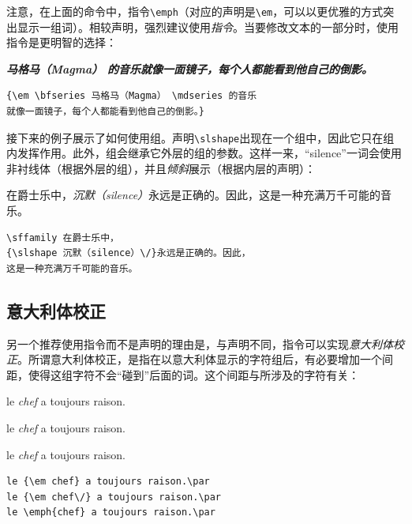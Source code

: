注意，在上面的命令中，指令\verb|\emph|（对应的声明是\verb|\em|，可以以更优雅的方式突出显示一组词）。相较声明，强烈建议使用\emph{指令}。当要修改文本的一部分时，使用指令是更明智的选择：

\begin{codelist}[2.2]{
    {\em \bfseries 马格马（Magma） \mdseries 的音乐就像一面镜子，每个人都能看到他自己的倒影。}
}
    \begin{verbatim}
{\em \bfseries 马格马（Magma） \mdseries 的音乐
就像一面镜子，每个人都能看到他自己的倒影。}
    \end{verbatim}
\end{codelist}

接下来的例子展示了如何使用组。声明\verb|\slshape|出现在一个组中，因此它只在组内发挥作用。此外，组会继承它外层的组的参数。这样一来，“silence”一词会使用\textsf{非衬线}体（根据外层的组），并且\textsl{倾斜}展示（根据内层的声明）：

\begin{codelist}[2.3]{
    \sffamily 在爵士乐中，{\slshape 沉默（silence）\/}永远是正确的。因此，这是一种充满万千可能的音乐。
}\begin{verbatim}\sffamily 在爵士乐中，
{\slshape 沉默（silence）\/}永远是正确的。因此，
这是一种充满万千可能的音乐。
\end{verbatim}
\end{codelist}

\subsection{意大利体校正}

另一个推荐使用指令而不是声明的理由是，与声明不同，指令可以实现\emph{意大利体校正}。所谓意大利体校正，是指在以意大利体显示的字符组后，有必要增加一个间距，使得这组字符不会“碰到”后面的词。这个间距与所涉及的字符有关：

\begin{codelist}[2.4]{
    le {\em chef} a toujours raison.\par
    le {\em chef\/} a toujours raison.\par
    le \emph{chef} a toujours raison.\par
}\begin{verbatim}le {\em chef} a toujours raison.\par
le {\em chef\/} a toujours raison.\par
le \emph{chef} a toujours raison.\par
\end{verbatim}
\end{codelist}


